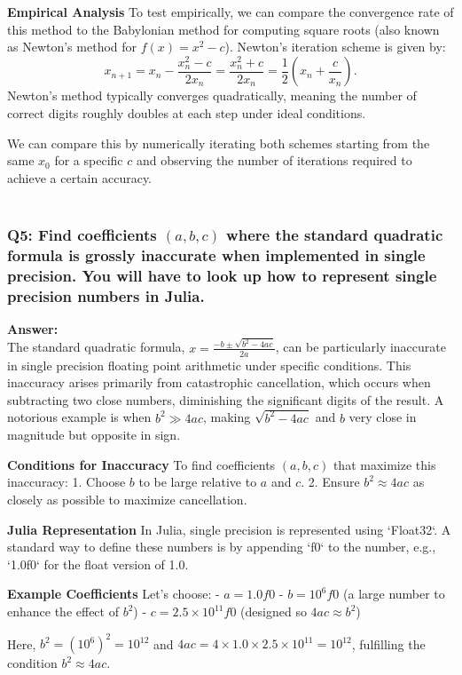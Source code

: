 \documentclass[8pt]{article}
\begin{document}
\textbf{Empirical Analysis}
To test empirically, we can compare the convergence rate of this method to the Babylonian method for computing square roots (also known as Newton’s method for $f(x) = x^2 - c$). Newton's iteration scheme is given by:
\[
x_{n+1} = x_n - \frac{x_n^2 - c}{2x_n} = \frac{x_n^2 + c}{2x_n} = \frac{1}{2} \left(x_n + \frac{c}{x_n}\right).
\]
Newton's method typically converges quadratically, meaning the number of correct digits roughly doubles at each step under ideal conditions.

We can compare this by numerically iterating both schemes starting from the same $x_0$ for a specific $c$ and observing the number of iterations required to achieve a certain accuracy. \\\\

\subsubsection*{Q5: Find coefficients $(a, b, c)$ where the standard quadratic formula is grossly inaccurate when implemented in single precision. You will have to look up how to represent single precision numbers in Julia.}

\textbf{Answer:}\\
The standard quadratic formula, $x = \frac{-b \pm \sqrt{b^2 - 4ac}}{2a}$, can be particularly inaccurate in single precision floating point arithmetic under specific conditions. This inaccuracy arises primarily from catastrophic cancellation, which occurs when subtracting two close numbers, diminishing the significant digits of the result. A notorious example is when $b^2 \gg 4ac$, making $\sqrt{b^2 - 4ac}$ and $b$ very close in magnitude but opposite in sign.

\textbf{Conditions for Inaccuracy}
To find coefficients $(a, b, c)$ that maximize this inaccuracy:
1. Choose $b$ to be large relative to $a$ and $c$.
2. Ensure $b^2 \approx 4ac$ as closely as possible to maximize cancellation.

\textbf{Julia Representation}
In Julia, single precision is represented using `Float32`. A standard way to define these numbers is by appending `f0` to the number, e.g., `1.0f0` for the float version of 1.0.

\textbf{Example Coefficients}
Let's choose:
- \( a = 1.0f0 \)
- \( b = 10^6f0 \) (a large number to enhance the effect of $b^2$)
- \( c = 2.5 \times 10^{11}f0 \) (designed so $4ac \approx b^2$)

Here, \( b^2 = (10^6)^2 = 10^{12} \) and \( 4ac = 4 \times 1.0 \times 2.5 \times 10^{11} = 10^{12} \), fulfilling the condition \( b^2 \approx 4ac \).
\end{document}
